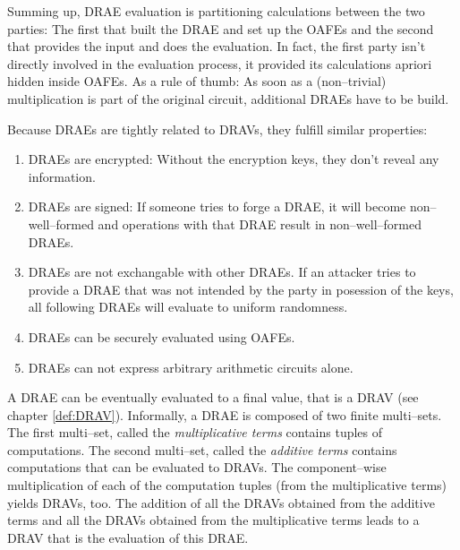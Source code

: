 Summing up, DRAE evaluation is partitioning calculations between the two
parties: The first that built the DRAE and set up the OAFEs and the second that
provides the input and does the evaluation. In fact, the first party isn't
directly involved in the evaluation process, it provided its calculations
apriori hidden inside OAFEs.  As a rule of thumb: As soon as a (non--trivial)
multiplication is part of the original circuit, additional DRAEs have to be
build.

Because DRAEs are tightly related to DRAVs, they fulfill similar properties:

\begin{enumerate}

  \item \label{prop:drae-encrypted} DRAEs are encrypted: Without the encryption
    keys, they don't reveal any information.

  \item \label{prop:drae-signed} DRAEs are signed: If someone tries to forge a
    DRAE, it will become non--well--formed and operations with that DRAE result
    in non--well--formed DRAEs.

  \item DRAEs are not exchangable with other DRAEs. If an attacker tries to
    provide a DRAE that was not intended by the party in posession of the keys,
    all following DRAEs will evaluate to uniform randomness.

  \item \label{prop:drae-oafe} DRAEs can be securely evaluated using OAFEs.

  \item \label{prop:drae-not-enough} DRAEs can not express arbitrary arithmetic
    circuits alone.

\end{enumerate}

\noindent{}A DRAE can be eventually evaluated to a final value, that is a DRAV
(see chapter \ref{def:DRAV}). Informally, a DRAE is composed of two finite
multi--sets. The first multi--set, called the \emph{multiplicative terms}
contains tuples of computations. The second multi--set, called the
\emph{additive terms} contains computations that can be evaluated to DRAVs. The
component--wise multiplication of each of the computation tuples (from the
multiplicative terms) yields DRAVs, too. The addition of all the DRAVs obtained
from the additive terms and all the DRAVs obtained from the multiplicative terms
leads to a DRAV that is the evaluation of this DRAE.

